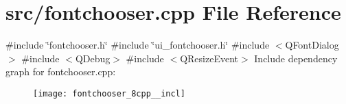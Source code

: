 \section{src/fontchooser.cpp File Reference}
\label{fontchooser_8cpp}
{\ttfamily \#include \char`\"{}fontchooser.\+h\char`\"{}}\newline
{\ttfamily \#include \char`\"{}ui\+\_\+fontchooser.\+h\char`\"{}}\newline
{\ttfamily \#include $<$Q\+Font\+Dialog$>$}\newline
{\ttfamily \#include $<$Q\+Debug$>$}\newline
{\ttfamily \#include $<$Q\+Resize\+Event$>$}\newline
Include dependency graph for fontchooser.\+cpp\+:\nopagebreak
\begin{figure}[H]
\begin{center}
\leavevmode
\texttt{[image: fontchooser\_8cpp\_\_incl]}
\end{center}
\end{figure}
